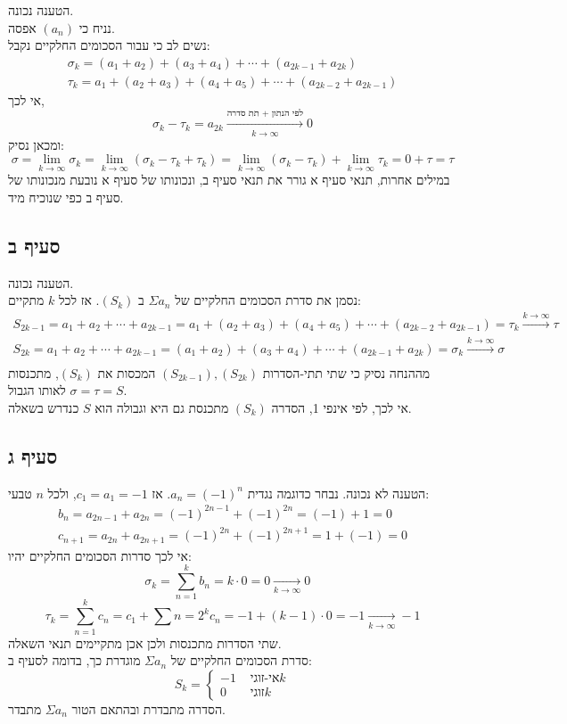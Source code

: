\documentclass{article}
\begin{document}
הטענה נכונה. \\
נניח כי $(a_n)$ אפסה. \\
נשים לב כי עבור הסכומים החלקיים נקבל:
\[
    \begin{matrix}
        \sigma_k=(a_1+a_2)+(a_3+a_4)+\cdots +(a_{2k-1}+a_{2k}) \\
        \tau_k=a_1+(a_2+a_3)+(a_4+a_5)+\cdots+(a_{2k-2}+a_{2k-1})
    \end{matrix}
\]
אי לכך,
\[
    \sigma_k-\tau_k=a_{2k}\xrightarrow[k\rightarrow\infty]{\text{לפי הנתון + תת סדרה}} 0
\]
ומכאן נסיק:
\[
    \sigma =
    \lim_{k\rightarrow \infty} \sigma_k =
    \lim_{k\rightarrow \infty} (\sigma_k-\tau_k+\tau_k) =
    \lim_{k\rightarrow \infty} (\sigma_k-\tau_k)+\lim_{k\rightarrow \infty}\tau_k =
    0 + \tau = \tau
\]
במילים אחרות, תנאי סעיף א גורר את תנאי סעיף ב, ונכונותו של סעיף א נובעת מנכונותו של סעיף ב כפי שנוכיח מיד.

\subsection*{סעיף ב}

הטענה נכונה. \\
נסמן את סדרת הסכומים החלקיים של $\Sigma a_n$ ב $(S_k)$. אז לכל $k$ מתקיים:
\[
    \begin{matrix}
        S_{2k-1}=a_1+a_2+\cdots+a_{2k-1}=a_1+(a_2+a_3)+(a_4+a_5)+\cdots+(a_{2k-2}+a_{2k-1})=\tau_k\xrightarrow{k\rightarrow\infty}\tau \\
        S_{2k}=a_1+a_2+\cdots+a_{2k-1}=(a_1+a_2)+(a_3+a_4)+\cdots+(a_{2k-1}+a_{2k})=\sigma_k\xrightarrow{k\rightarrow\infty}\sigma     \\
    \end{matrix}
\]
מההנחה נסיק כי שתי תתי-הסדרות $(S_{2k-1}), (S_{2k})$ המכסות את $(S_k)$, מתכנסות לאותו הגבול $\sigma=\tau=S$. \\
אי לכך, לפי אינפי 1, הסדרה $(S_k)$ מתכנסת גם היא וגבולה הוא $S$ כנדרש בשאלה.

\subsection*{סעיף ג}

הטענה לא נכונה.
נבחר כדוגמה נגדית $a_n=(-1)^n$. אז $c_1=a_1=-1$, ולכל $n$ טבעי:
\[
    \begin{matrix}
        b_n=a_{2n-1}+a_{2n}=(-1)^{2n-1}+(-1)^{2n}=(-1)+1=0 \\
        c_{n+1}=a_{2n}+a_{2n+1}=(-1)^{2n}+(-1)^{2n+1}=1+(-1)=0
    \end{matrix}
\]
אי לכך סדרות הסכומים החלקיים יהיו:
\[
    \sigma_k=\sum_{n=1}^k b_n = k \cdot 0 = 0\xrightarrow[k\rightarrow \infty]{} 0 \;\;\;
\]
\[
    \tau_k=\sum_{n=1}^{k} c_n = c_1 + \sum{n=2}^k c_n = -1 + (k-1)\cdot 0 = -1 \xrightarrow[k\rightarrow \infty]{}-1
\]
שתי הסדרות מתכנסות ולכן אכן מתקיימים תנאי השאלה. \\
סדרת הסכומים החלקיים של $\Sigma a_n$ מוגדרת כך, בדומה לסעיף ב:
\[
    S_k=\begin{cases}
        -1 & \text{ אי-זוגי} k \\
        0  & \text{ זוגי} k
    \end{cases}
\]
הסדרה מתבדרת ובהתאם הטור $\Sigma a_n$ מתבדר.
\end{document}
